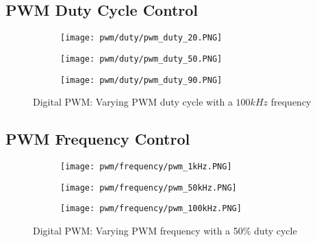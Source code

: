 \subsection{PWM Duty Cycle Control}
\begin{figure}[H]
    
    \centering
    \begin{subfigure}{0.45\textwidth}
        \texttt{[image: pwm/duty/pwm\_duty\_20.PNG]}
    \end{subfigure}
    \begin{subfigure}{0.45\textwidth}
        \texttt{[image: pwm/duty/pwm\_duty\_50.PNG]}
    \end{subfigure}
    \begin{subfigure}{0.45\textwidth}
        \texttt{[image: pwm/duty/pwm\_duty\_90.PNG]}
    \end{subfigure}
    \caption{Digital PWM: Varying PWM duty cycle with a $100kHz$ frequency}

\end{figure}

\subsection{PWM Frequency Control}
\begin{figure}[H]
    \centering
    \begin{subfigure}{0.45\textwidth}
        \texttt{[image: pwm/frequency/pwm\_1kHz.PNG]}
    \end{subfigure}
    \begin{subfigure}{0.45\textwidth}
        \texttt{[image: pwm/frequency/pwm\_50kHz.PNG]}
    \end{subfigure}
    \begin{subfigure}{0.45\textwidth}
        \texttt{[image: pwm/frequency/pwm\_100kHz.PNG]}
    \end{subfigure}
    \caption{Digital PWM: Varying PWM frequency with a 50\% duty cycle}

\end{figure}
